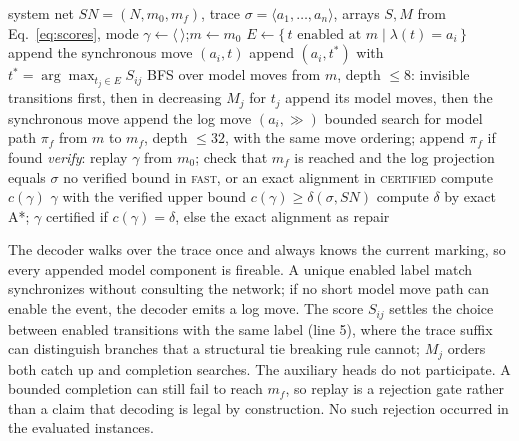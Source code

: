 \documentclass[manuscript,screen,nonacm]{acmart}
\begin{document}
\begin{algorithm}
\caption{Guided greedy decoding, verification, and certification.}
\label{alg:decode}
\footnotesize
\begin{algorithmic}[1]
\Require system net $SN = (N, m_0, m_f)$, trace $\sigma = \langle a_1, \ldots, a_n \rangle$, arrays $S,M$ from Eq.~\eqref{eq:scores}, mode
\State $\gamma \gets \langle\,\rangle$;\quad $m \gets m_0$ 
  \State $E \gets \{\, t \text{ enabled at } m \mid \lambda(t) = a_i \,\}$
   append the synchronous move $(a_i, t)$ 
   append $(a_i, t^\ast)$ with $t^\ast = \arg\max_{t_j \in E} S_{ij}$ 
  \Else{} BFS over model moves from $m$, depth $\leq 8$: invisible transitions first, then in decreasing $M_j$ for $t_j$
     append its model moves, then the synchronous move
    \Else{} append the log move $(a_i, \gg)$ 
    \EndIf
  \EndIf
\EndFor
\State bounded search for model path $\pi_f$ from $m$ to $m_f$, depth $\leq 32$, with the same move ordering; append $\pi_f$ if found
\State \emph{verify}: replay $\gamma$ from $m_0$; check that $m_f$ is reached and the log projection equals $\sigma$
 \Return no verified bound in \textsc{fast}, or an exact alignment in \textsc{certified}
\EndIf
\State compute $c(\gamma)$
 \Return $\gamma$ with the verified upper bound $c(\gamma) \geq \delta(\sigma, SN)$
\Else{} compute $\delta$ by exact A*; \Return $\gamma$ certified if $c(\gamma) = \delta$, else the exact alignment as repair
\EndIf
\end{algorithmic}
\end{algorithm}

The decoder walks over the trace once and always knows the current marking, so every appended model component is fireable. A unique enabled label match synchronizes without consulting the network; if no short model move path can enable the event, the decoder emits a log move. The score $S_{ij}$ settles the choice between enabled transitions with the same label (line 5), where the trace suffix can distinguish branches that a structural tie breaking rule cannot; $M_j$ orders both catch up and completion searches. The auxiliary heads do not participate. A bounded completion can still fail to reach $m_f$, so replay is a rejection gate rather than a claim that decoding is legal by construction. No such rejection occurred in the evaluated instances.
\end{document}

